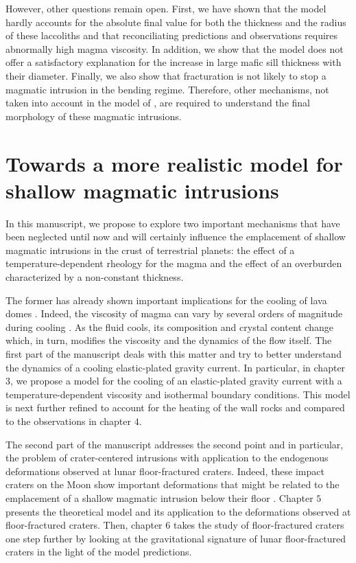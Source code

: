 However, other questions  remain open.  First, we have  shown that the
model  hardly accounts  for  the  absolute final  value  for both  the
thickness and the  radius of these laccoliths  and that reconciliating
predictions and observations requires abnormally high magma viscosity.
In addition,  we show  that the  model does  not offer  a satisfactory
explanation for the increase in  large mafic sill thickness with their
diameter. Finally,  we also  show that fracturation  is not  likely to
stop  a magmatic  intrusion in  the bending  regime. Therefore,  other
mechanisms,    not   taken    into   account    in   the    model   of
\citet{Michaut:2011kg},   are  required   to   understand  the   final
morphology of these magmatic intrusions.

\section{Towards   a  more   realistic  model   for  shallow   magmatic
  intrusions}
\label{C2-sec:discussion}

In this  manuscript, we  propose to  explore two  important mechanisms
that have  been neglected until  now and will certainly  influence the
emplacement of shallow magmatic intrusions in the crust of terrestrial
planets: the effect of a temperature-dependent rheology for the magma and
the effect of an overburden characterized by a non-constant thickness.

The former has already shown important implications for the cooling of
lava                                                             domes
\citep{Bercovici:2007vc,Bercovici:1996uu,BALMFORTH:1999ey,Garel:2014era}. Indeed,
the viscosity of magma can vary by several orders of magnitude during
cooling \citep{Anonymous:CZVBrBvv,Lejeune:1995fc}. As the fluid cools,
its composition  and crystal content  change which, in  turn, modifies
the viscosity and the dynamics of  the flow itself.  The first part of
the manuscript deals with this matter and try to better understand the
dynamics of a cooling  elastic-plated gravity current.  In particular,
in  chapter   $3$,  we  propose  a   model  for  the  cooling   of  an
elastic-plated gravity current  with a temperature-dependent viscosity
and  isothermal  boundary  conditions.   This model  is  next  further
refined to account  for the heating of the wall  rocks and compared to
the observations in chapter $4$.

The second  part of the manuscript  addresses the second point  and in
particular, the problem of crater-centered intrusions with application
to  the  endogenous  deformations observed  at  lunar  floor-fractured
craters.   Indeed, these  impact craters  on the  Moon show  important
deformations that  might be  related to the  emplacement of  a shallow
magmatic intrusion below  their floor \citep{Schultz:1976kt}.  Chapter
$5$  presents  the  theoretical  model  and  its  application  to  the
deformations observed  at floor-fractured  craters. Then,  chapter $6$
takes the study of floor-fractured craters one step further by looking
at the gravitational signature of lunar floor-fractured craters in the
light of the model predictions.

